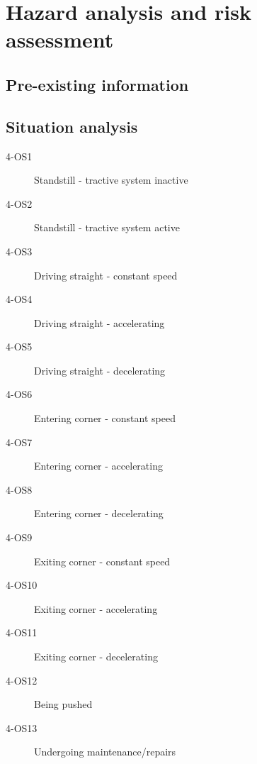 \section{Hazard analysis and risk assessment}
%
%
% 

\subsection{Pre-existing information}
%


\subsection{Situation analysis}
%
%
\begin{description}  
	\item [4-OS1] Standstill - tractive system inactive
	\item [4-OS2] Standstill - tractive system active
	\item [4-OS3] Driving straight - constant speed
	\item [4-OS4] Driving straight - accelerating
	\item [4-OS5] Driving straight - decelerating
	\item [4-OS6] Entering corner - constant speed
	\item [4-OS7] Entering corner - accelerating
	\item [4-OS8] Entering corner - decelerating
	\item [4-OS9] Exiting corner - constant speed
	\item [4-OS10] Exiting corner - accelerating
	\item [4-OS11] Exiting corner - decelerating
	\item [4-OS12] Being pushed
	\item [4-OS13] Undergoing maintenance/repairs
\end{description}


